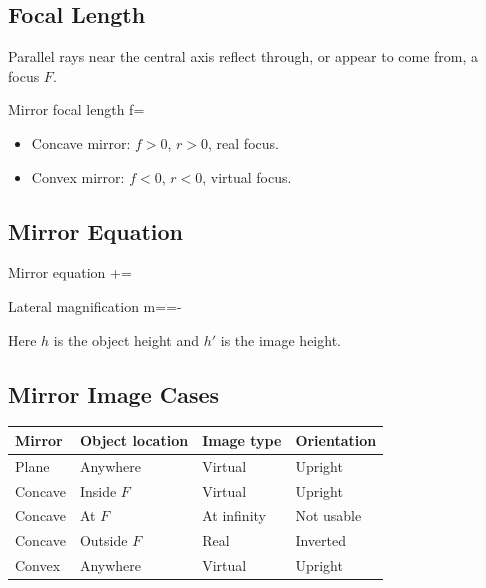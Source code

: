 \documentclass{studentnotes}
\begin{document}
\subsection{Focal Length}

Parallel rays near the central axis reflect through, or appear to come from, a
focus \(F\).

\begin{namedformula}{Mirror focal length}
    f=
\end{namedformula}

\begin{itemize}
    \item Concave mirror: \(f>0\), \(r>0\), real focus.
    \item Convex mirror: \(f<0\), \(r<0\), virtual focus.
\end{itemize}

\subsection{Mirror Equation}

\begin{namedformula}{Mirror equation}
    +=
\end{namedformula}

\begin{namedformula}{Lateral magnification}
    m==-
\end{namedformula}

Here \(h\) is the object height and \(h'\) is the image height.

\subsection{Mirror Image Cases}

\begin{center}
\renewcommand{\arraystretch}{1.35}
\begin{tabular}{>{\raggedright\arraybackslash}p{3.2cm}
                >{\raggedright\arraybackslash}p{3.2cm}
                >{\raggedright\arraybackslash}p{3.2cm}
                >{\raggedright\arraybackslash}p{3.2cm}}
\toprule
\textbf{Mirror} & \textbf{Object location} & \textbf{Image type} & \textbf{Orientation} \\
\midrule
Plane & Anywhere & Virtual & Upright \\
Concave & Inside \(F\) & Virtual & Upright \\
Concave & At \(F\) & At infinity & Not usable \\
Concave & Outside \(F\) & Real & Inverted \\
Convex & Anywhere & Virtual & Upright \\
\bottomrule
\end{tabular}
\end{center}
\end{document}
